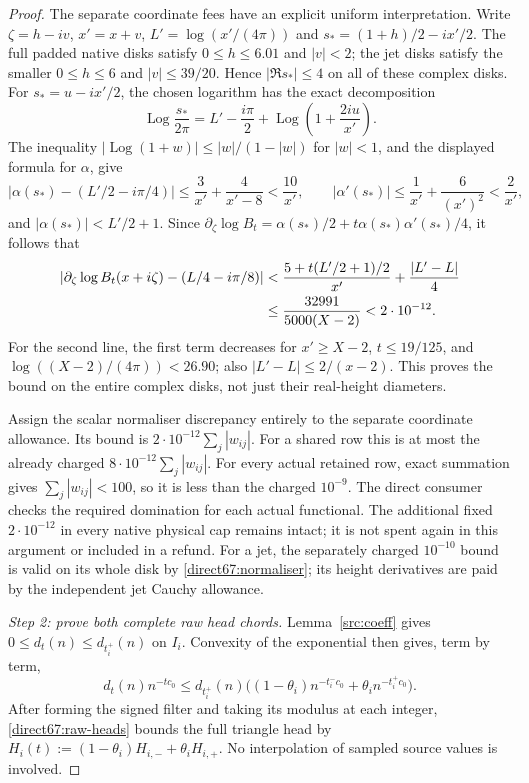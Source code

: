 \documentclass[11pt,a4paper]{article}
\theoremstyle{definition}
\theoremstyle{remark}
\DeclareMathOperator{\Log}{Log}
\begin{document}
\begin{proof}
The separate coordinate fees have an explicit uniform interpretation.
Write $\zeta=h-iv$, $x'=x+v$, $L'=\log(x'/(4\pi))$ and
$s_*=(1+h)/2-ix'/2$.  The full padded native disks satisfy
$0\le h\le6.01$ and $|v|<2$; the jet disks satisfy the smaller
$0\le h\le6$ and $|v|\le39/20$.  Hence $|\Re s_*|\le4$ on
all of these complex disks.  For $s_*=u-ix'/2$, the chosen logarithm
has the exact decomposition
\[
 \Log\frac{s_*}{2\pi}
 =L'-\frac{i\pi}{2}+\Log\left(1+\frac{2iu}{x'}\right).
\]
The inequality $|\Log(1+w)|\le |w|/(1-|w|)$ for $|w|<1$,
and the displayed formula for $\alpha$, give
\[
 |\alpha(s_*)-(L'/2-i\pi/4)|
 \le\frac3{x'}+\frac4{x'-8}<\frac{10}{x'},\qquad
 |\alpha'(s_*)|\le\frac1{x'}+\frac6{(x')^2}<\frac2{x'},
\]
and $|\alpha(s_*)|<L'/2+1$.  Since
$\partial_\zeta\log B_t=\alpha(s_*)/2+t\alpha(s_*)\alpha'(s_*)/4$,
it follows that
\begin{align}
 \left|\partial_\zeta\log B_t(x+i\zeta)
                    -(L/4-i\pi/8)\right|
 &<\frac{5+t(L'/2+1)/2}{x'}+\frac{|L'-L|}{4}\notag\\
 &\le\frac{32991}{5000(X-2)}<2\cdot10^{-12}.
 \label{direct67:normaliser}
\end{align}
For the second line, the first term decreases for $x'\ge X-2$,
$t\le19/125$, and $\log((X-2)/(4\pi))<26.90$; also
$|L'-L|\le2/(x-2)$.  This proves the bound on the entire complex
disks, not just their real-height diameters.

Assign the scalar normaliser discrepancy entirely to the separate
coordinate allowance.  Its bound is
$2\cdot10^{-12}\sum_j|w_{ij}|$.  For a shared row this is at most
the already charged $8\cdot10^{-12}\sum_j|w_{ij}|$.
For every actual retained row, exact summation gives
$\sum_j|w_{ij}|<100$, so it is less than the charged $10^{-9}$.
The direct consumer checks the required domination for each actual
functional.  The additional fixed $2\cdot10^{-12}$ in every native
physical cap remains intact; it is not spent again in this argument or
included in a refund.  For a jet, the separately charged $10^{-10}$
bound is valid on its whole disk by \eqref{direct67:normaliser}; its
height derivatives are paid by the independent jet Cauchy allowance.

\emph{Step 2: prove both complete raw head chords.}
Lemma~\ref{src:coeff} gives $0\le d_t(n)\le d_{t_i^+}(n)$ on $I_i$.
Convexity of the exponential then gives, term by term,
\[
 d_t(n)n^{-tc_0}
 \le d_{t_i^+}(n)
 \bigl((1-\theta_i)n^{-t_i^-c_0}
                      +\theta_i n^{-t_i^+c_0}\bigr).
\]
After forming the signed filter and taking its modulus at each integer,
\eqref{direct67:raw-heads} bounds the full triangle head by
$H_i(t):=(1-\theta_i)H_{i,-}+\theta_iH_{i,+}$.
No interpolation of sampled source values is involved.


\end{proof}
\end{document}
